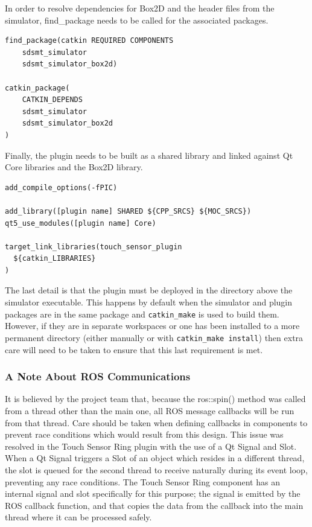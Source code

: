 \begin{itemize}
In order to resolve dependencies for Box2D and the header files from the simulator, find\_package needs to be called for the associated packages.
\begin{lstlisting}
find_package(catkin REQUIRED COMPONENTS
    sdsmt_simulator
    sdsmt_simulator_box2d)
    
catkin_package(
    CATKIN_DEPENDS
    sdsmt_simulator
    sdsmt_simulator_box2d
)
\end{lstlisting}


Finally, the plugin needs to be built as a shared library and linked against Qt Core libraries and the Box2D library.
\begin{lstlisting}
add_compile_options(-fPIC)

add_library([plugin name] SHARED ${CPP_SRCS} ${MOC_SRCS})
qt5_use_modules([plugin name] Core)

target_link_libraries(touch_sensor_plugin
  ${catkin_LIBRARIES}
)
\end{lstlisting}

The last detail is that the plugin must be deployed in the directory above the simulator executable. This happens by default when the simulator and plugin packages are in the same package and \lstinline|catkin_make| is used to build them. However, if they are in separate workspaces or one has been installed to a more permanent directory (either manually or with \lstinline|catkin_make install|) then extra care will need to be taken to ensure that this last requirement is met.

\subsubsection*{A Note About ROS Communications}
It is believed by the project team that, because the ros::spin() method was called from a thread other than the main one, all ROS message callbacks will be run from that thread. Care should be taken when defining callbacks in components to prevent race conditions which would result from this design. This issue was resolved in the Touch Sensor Ring plugin with the use of a Qt Signal and Slot. When a Qt Signal triggers a Slot of an object which resides in a different thread, the slot is queued for the second thread to receive naturally during its event loop, preventing any race conditions. The Touch Sensor Ring component has an internal signal and slot specifically for this purpose; the signal is emitted by the ROS callback function, and that copies the data from the callback into the main thread where it can be processed safely.

\end{itemize}